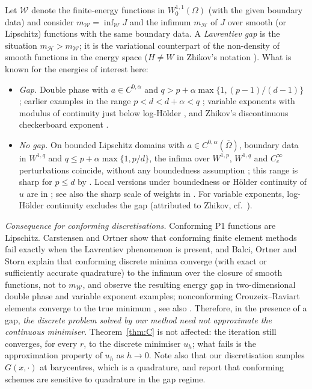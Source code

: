 \documentclass[11pt]{amsart}
\theoremstyle{definition}
\theoremstyle{remark}
\numberwithin{equation}{section}
\begin{document}
Let $\mathcal W$ denote the finite-energy functions in $W^{1,1}_0(\Omega)$ (with the given boundary data) and consider $m_{\mathcal W}=\inf_{\mathcal W}J$ and the infimum $m_{\mathcal H}$ of $J$ over smooth (or Lipschitz) functions with the same boundary data. A \emph{Lavrentiev gap} is the situation $m_{\mathcal H}>m_{\mathcal W}$; it is the variational counterpart of the non-density of smooth functions in the energy space ($H\ne W$ in Zhikov's notation \cite{Zhikov1986,Zhikov1995}). What is known for the energies of interest here:
\begin{itemize}[leftmargin=1.5em]
\item \emph{Gap.} Double phase with $a\in C^{0,\alpha}$ and $q>p+\alpha\max\{1,(p-1)/(d-1)\}$ \cite[Thm.~32]{BDS2020}; earlier examples in the range $p<d<d+\alpha<q$ \cite{Zhikov1995,ELM2004}; variable exponents with modulus of continuity just below log-H\"older \cite[Thm.~30]{BDS2020}, and Zhikov's discontinuous checkerboard exponent \cite{Zhikov1986}.
\item \emph{No gap.} On bounded Lipschitz domains with $a\in C^{0,\alpha}(\overline\Omega)$, boundary data in $W^{1,q}$ and $q\le p+\alpha\max\{1,p/d\}$, the infima over $W^{1,p}$, $W^{1,q}$ and $C^\infty_c$ perturbations coincide, without any boundedness assumption \cite[Thm.~2.3]{BGS2022}; this range is sharp for $p\le d$ by \cite{BDS2020}. Local versions under boundedness or H\"older continuity of $u$ are in \cite[Thm.~1.4]{BaroniColomboMingione2018}; see also the sharp scale of weights in \cite{BCDM2024}. For variable exponents, log-H\"older continuity excludes the gap (attributed to Zhikov, cf.\ \cite{Zhikov1995}).
\end{itemize}

\emph{Consequence for conforming discretisations.} Conforming P1 functions are Lipschitz. Carstensen and Ortner \cite{CarstensenOrtner2010} show that conforming finite element methods fail exactly when the Lavrentiev phenomenon is present, and Balci, Ortner and Storn \cite{BalciOrtnerStorn2022} explain that conforming discrete minima converge (with exact or sufficiently accurate quadrature) to the infimum over the closure of smooth functions, not to $m_{\mathcal W}$, and observe the resulting energy gap in two-dimensional double phase and variable exponent examples; nonconforming Crouzeix--Raviart elements converge to the true minimum \cite[Thm.~1]{BalciOrtnerStorn2022}, see also \cite{Ortner2011,BalciKaltenbach2023}. Therefore, in the presence of a gap, \emph{the discrete problem solved by our method need not approximate the continuous minimiser}. Theorem~\ref{thm:C} is not affected: the iteration still converges, for every $r$, to the discrete minimiser $u_h$; what fails is the approximation property of $u_h$ as $h\to0$. Note also that our discretisation samples $G(x,\cdot)$ at barycentres, which is a quadrature, and \cite{BalciOrtnerStorn2022} report that conforming schemes are sensitive to quadrature in the gap regime.
\end{document}
